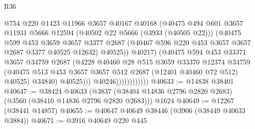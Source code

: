 \begin{lexlean}{R36}
\begin{coremodule}
                                  @754
                                  @220
                                  @1423
                                  @11966
                                  @3657
                                  @40167
                                  @40168
                                  (@40475
                                    @494
                                    @601
                                    @3657
                                    @11931
                                    @5666
                                    @12594
                                    (@40502 @22 @5666 (@3933 (@40505 @22)))
                                    (@40475
                                      @599
                                      @453
                                      @3659
                                      @3657
                                      @3377
                                      @2687
                                      (@40467 @596 @220 @453 @3657 @3657 @2687 @3377 @40525 @12632)
                                      @40525))
                                  @40217)
                                (@40475
                                  @594
                                  @453
                                  @33371
                                  @3657
                                  @34759
                                  @2687
                                  (@4228
                                    @40460
                                    @28
                                    @515
                                    @3659
                                    @33370
                                    @12374
                                    @34759
                                    (@40475
                                      @513
                                      @453
                                      @3657
                                      @3657
                                      @512
                                      @2687
                                      (@12401 @40460 @72 @512)
                                      @40525)
                                    @34840)
                                  @40525)))
                            @40246))))))))))))
@40633 := @14838 @38401
@40647 := @38424
    @40633
    (@3837 (@38404 @14836 @2796 @2820 @2683) (@3560 (@38410 @14836 @2796 @2820 @2683)))
    @1624
@40649 := @12267 (@38441 @14857)
@40655 := @40647 @40649 @38446 (@3906 (@38449 @40633 @3884))
@40671 := @3916
    @40649
    @220
    @445

\end{coremodule}
\end{lexlean}
